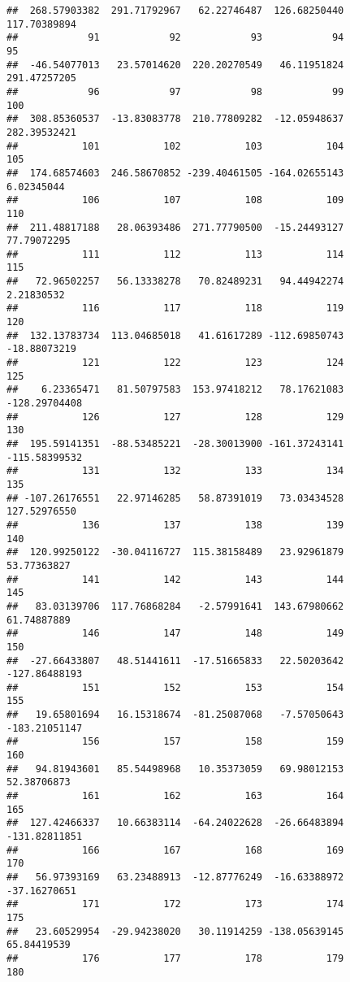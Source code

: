 \documentclass[
]{article}
\begin{document}
\begin{verbatim}
##  268.57903382  291.71792967   62.22746487  126.68250440  117.70389894 
##            91            92            93            94            95 
##  -46.54077013   23.57014620  220.20270549   46.11951824  291.47257205 
##            96            97            98            99           100 
##  308.85360537  -13.83083778  210.77809282  -12.05948637  282.39532421 
##           101           102           103           104           105 
##  174.68574603  246.58670852 -239.40461505 -164.02655143    6.02345044 
##           106           107           108           109           110 
##  211.48817188   28.06393486  271.77790500  -15.24493127   77.79072295 
##           111           112           113           114           115 
##   72.96502257   56.13338278   70.82489231   94.44942274    2.21830532 
##           116           117           118           119           120 
##  132.13783734  113.04685018   41.61617289 -112.69850743  -18.88073219 
##           121           122           123           124           125 
##    6.23365471   81.50797583  153.97418212   78.17621083 -128.29704408 
##           126           127           128           129           130 
##  195.59141351  -88.53485221  -28.30013900 -161.37243141 -115.58399532 
##           131           132           133           134           135 
## -107.26176551   22.97146285   58.87391019   73.03434528  127.52976550 
##           136           137           138           139           140 
##  120.99250122  -30.04116727  115.38158489   23.92961879   53.77363827 
##           141           142           143           144           145 
##   83.03139706  117.76868284   -2.57991641  143.67980662   61.74887889 
##           146           147           148           149           150 
##  -27.66433807   48.51441611  -17.51665833   22.50203642 -127.86488193 
##           151           152           153           154           155 
##   19.65801694   16.15318674  -81.25087068   -7.57050643 -183.21051147 
##           156           157           158           159           160 
##   94.81943601   85.54498968   10.35373059   69.98012153   52.38706873 
##           161           162           163           164           165 
##  127.42466337   10.66383114  -64.24022628  -26.66483894 -131.82811851 
##           166           167           168           169           170 
##   56.97393169   63.23488913  -12.87776249  -16.63388972  -37.16270651 
##           171           172           173           174           175 
##   23.60529954  -29.94238020   30.11914259 -138.05639145   65.84419539 
##           176           177           178           179           180 

\end{verbatim}
\end{document}
